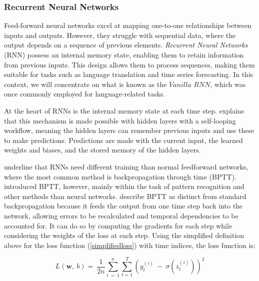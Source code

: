 \documentclass[12pt,a4paper]{article}
\begin{document}
\subsubsection{Recurrent Neural Networks}

Feed-forward neural networks excel at mapping one-to-one relationships between inputs and outputs. However, they struggle with sequential data, where the output depends on a sequence of previous elements. \textit{Recurrent Neural Networks} (RNN) possess an internal memory state, enabling them to retain information from previous inputs. This design allows them to process sequences, making them suitable for tasks such as language translation and time series forecasting. In this context, we will concentrate on what is known as the $Vanilla$ $RNN$, which was once commonly employed for language-related tasks.

At the heart of RNNs is the internal memory state at each time step. \cite{Staudemeyer2019} explains that this mechanism is made possible with hidden layers with a self-looping workflow, meaning the hidden layers can remember previous inputs and use these to make predictions. Predictions are made with the current input, the learned weights and biases, and the stored memory of the hidden layers.


\cite{Staudemeyer2019} underline that RNNs need different training than normal feedforward networks, where the most common method is backpropagation through time (BPTT). \cite{werbos1990backpropagation} introduced BPTT, however, mainly within the task of pattern recognition and other methods than neural networks. \cite{Raschka2017} describe BPTT as distinct from standard backpropagation because it feeds the output from one time step back into the network, allowing errors to be recalculated and temporal dependencies to be accounted for. It can do so by computing the gradients for each step while considering the weights of the loss at each step. Using the simplified definition above for the loss function (\ref{simplifiedloss}) with time indices, the loss function is:

\begin{equation}
  L\left(\textbf{w},\ b\right)=\ \frac{1}{2n}\sum_{i\ =\ 1}^{n}\sum_{t=1}^{T}\left(y_t^{\left(i\right)}\ -\ \sigma\left(z_t^{\left(i\right)}\right)\right)^2
  \label{simplifiedlosstime}
\end{equation}
\end{document}
